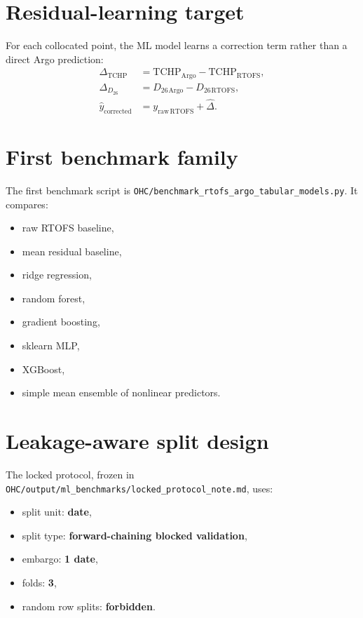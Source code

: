 \documentclass[11pt]{report}
\newcommand{\code}[1]{\texttt{#1}}
\newcommand{\TCHP}{\ensuremath{\mathrm{TCHP}}}
\newcommand{\Dtwentysix}{\ensuremath{D_{26}}}
\begin{document}
\section{Residual-learning target}
For each collocated point, the ML model learns a correction term rather than a direct Argo prediction:
\begin{align}
\Delta_{\TCHP} &= \TCHP_{\mathrm{Argo}} - \TCHP_{\mathrm{RTOFS}}, \\
\Delta_{\Dtwentysix{}} &= \Dtwentysix{}_{\mathrm{Argo}} - \Dtwentysix{}_{\mathrm{RTOFS}}, \\
\widehat{y}_{\mathrm{corrected}} &= y_{\mathrm{raw\,RTOFS}} + \widehat{\Delta}.
\end{align}

\section{First benchmark family}
The first benchmark script is \code{OHC/benchmark\_rtofs\_argo\_tabular\_models.py}. It compares:
\begin{itemize}[leftmargin=1.3em]
  \item raw RTOFS baseline,
  \item mean residual baseline,
  \item ridge regression,
  \item random forest,
  \item gradient boosting,
  \item sklearn MLP,
  \item XGBoost,
  \item simple mean ensemble of nonlinear predictors.
\end{itemize}

\section{Leakage-aware split design}
The locked protocol, frozen in \code{OHC/output/ml\_benchmarks/locked\_protocol\_note.md}, uses:
\begin{itemize}[leftmargin=1.3em]
  \item split unit: \textbf{date},
  \item split type: \textbf{forward-chaining blocked validation},
  \item embargo: \textbf{1 date},
  \item folds: \textbf{3},
  \item random row splits: \textbf{forbidden}.
\end{itemize}
\end{document}
